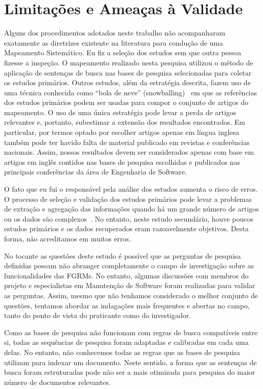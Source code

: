 \section{Limitações e Ameaças à Validade}
\label{sec:map_limitacoes_ameacas}

Alguns dos procedimentos adotados neste trabalho não acompanharam exatamente as
diretrizes existente na literatura para condução de uma Mapeamento Sistemático.
Eu fiz a seleção dos estudos sem que outra pessoa fizesse a inspeção. O
mapeamento realizado nesta pesquisa utilizou o método de aplicação de sentenças
de busca nas bases de pesquisa selecionadas para coletar os estudos primários.
Outros estudos, além da estratégia descrita, fazem uso de uma técnica conhecida
como ``bola de neve'' (snowballing)~\cite{wohlin2014guidelines} em que as
referências dos estudos primários podem ser usadas para compor o conjunto de
artigos do mapeamento. O uso de uma única estratégia pode levar a perda de
artigos relevantes e, portanto, subestimar a extensão dos resultados
encontrados. Em particular, por termos optado por escolher artigos apenas em
língua inglesa também pode ter havido falta de material publicado em revistas e
conferências nacionais. Assim, nossos resultados devem ser considerados apenas
com base em artigos em inglês contidos nas bases de pesquisa escolhidas e
publicados nas principais conferências da área de Engenharia de Software.

O fato que eu fui o responsável pela análise dos estudos aumenta o risco de
erros. O processo de seleção e validação dos estudos primários pode levar a
problemas de extração e agregação das informações quando há um grande número de
artigos ou os dados são complexos~\cite{keele2007guidelines}. No entanto, neste
estudo secundário, houve poucos estudos primários e os dados recuperados eram
razoavelmente objetivos.  Desta forma, não acreditamos em muitos erros.

No tocante as questões deste estudo  é  possível que as perguntas de pesquisa
definidas possam não abranger completamente o campo de investigação sobre as
funcionalidades das FGRMs. No entanto, algumas discussões com membros do
projeto e especialistas em Manutenção de Software foram realizadas para validar
as perguntas. Assim, mesmo que não tenhamos considerado o melhor conjunto de
questões, tentamos abordar as indagações mais frequentes e abertas no campo,
tanto do ponto de vista do praticante como do investigador.

Como as bases de pesquisa não funcionam com regras de busca compatíveis entre
si, todas as sequências de pesquisa foram adaptadas e calibradas em cada uma
delas. No entanto, não conhecemos todas as regras que as bases de pesquisa
utilizam para indexar um documento. Neste sentido, a forma que as sentenças de
busca foram estruturadas pode não ser a mais otimizada para pesquisa do maior
número de documentos relevantes.

